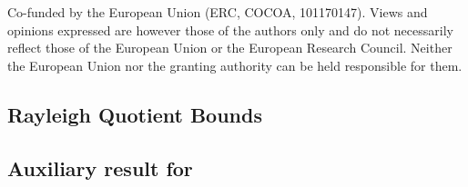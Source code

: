 \documentclass[a4paper,11pt,oneside]{amsart}
\theoremstyle{definition}
\theoremstyle{remark}
\numberwithin{equation}{section}
\numberwithin{theorem}{section}
\begin{document}
Co-funded by the European Union (ERC, COCOA, 101170147). Views and opinions expressed are however those of the authors only and do not necessarily reflect those of the European Union or the European Research Council. Neither the European Union nor the granting authority can be held responsible for them.






\begin{appendix}

\section{Rayleigh Quotient Bounds}

\subsection{Auxiliary result for }





\end{appendix}
\end{document}
